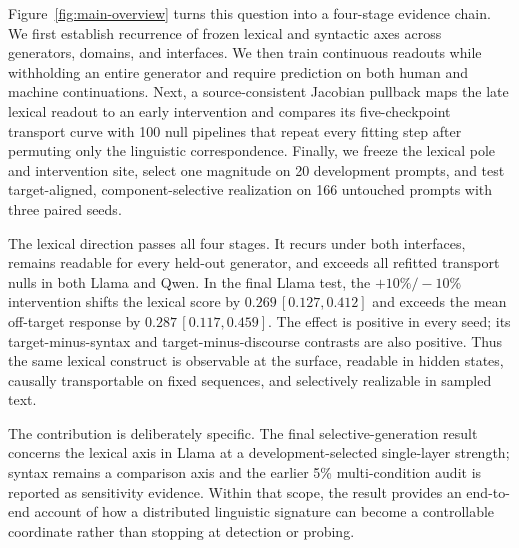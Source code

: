 Figure~\ref{fig:main-overview} turns this question into a four-stage evidence chain. We first establish recurrence of frozen lexical and syntactic axes across generators, domains, and interfaces. We then train continuous readouts while withholding an entire generator and require prediction on both human and machine continuations. Next, a source-consistent Jacobian pullback maps the late lexical readout to an early intervention and compares its five-checkpoint transport curve with 100 null pipelines that repeat every fitting step after permuting only the linguistic correspondence. Finally, we freeze the lexical pole and intervention site, select one magnitude on 20 development prompts, and test target-aligned, component-selective realization on 166 untouched prompts with three paired seeds.

The lexical direction passes all four stages. It recurs under both interfaces, remains readable for every held-out generator, and exceeds all refitted transport nulls in both Llama and Qwen. In the final Llama test, the \(+10\%/-10\%\) intervention shifts the lexical score by \(0.269\,[0.127,0.412]\) and exceeds the mean off-target response by \(0.287\,[0.117,0.459]\). The effect is positive in every seed; its target-minus-syntax and target-minus-discourse contrasts are also positive. Thus the same lexical construct is observable at the surface, readable in hidden states, causally transportable on fixed sequences, and selectively realizable in sampled text.

The contribution is deliberately specific. The final selective-generation result concerns the lexical axis in Llama at a development-selected single-layer strength; syntax remains a comparison axis and the earlier 5\% multi-condition audit is reported as sensitivity evidence. Within that scope, the result provides an end-to-end account of how a distributed linguistic signature can become a controllable coordinate rather than stopping at detection or probing.

